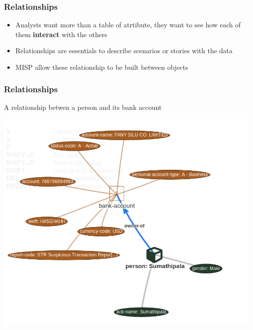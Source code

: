 \begin{frame}
    \frametitle{Relationships}
    \begin{itemize}
        \item Analysts want more than a table of atrtibute, they want to see how each of them \textbf{interact} with the others
        \item Relationships are essentials to describe scenarios or stories with the data
        \item MISP allow these relationship to be built between objects
    \end{itemize}
\end{frame}

\begin{frame}
    \frametitle{Relationships}
    A relationship betwen a person and its bank account
    \begin{center}
        \includegraphics[width=0.8\linewidth]{pictures/relationship.png}
    \end{center}
\end{frame}

